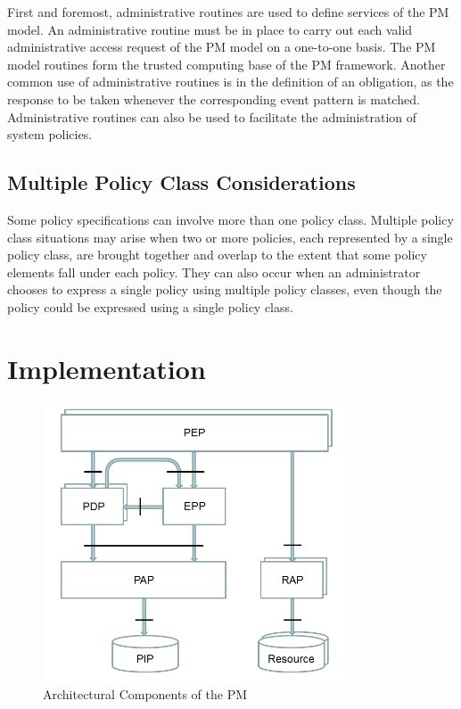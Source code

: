 \documentclass[12pt,a4paper,titlepage]{book}
\begin{document}
	First and foremost, administrative routines are used to define services of the PM model. An administrative routine must be in place to carry out each valid administrative access request of the PM model on a one-to-one basis. The PM model routines form the trusted computing base of the PM framework. Another common use of administrative routines is in the definition of an obligation, as the response to be taken whenever the corresponding event pattern is matched. Administrative routines can also be used to facilitate the administration of system policies.
	
	\section{Multiple Policy Class Considerations}
	
	Some policy specifications can involve more than one policy class. Multiple policy class situations may arise when two or more policies, each represented by a single policy class, are brought together and overlap to the extent that some policy elements fall under each policy. They can also occur when an administrator chooses to express a single policy using multiple policy classes, even though the policy could be expressed using a single policy class.
	
	\chapter{Implementation}
	
	\begin{figure}[h]
		\centering
		\includegraphics[width = 0.8\textwidth]{images/ArchitecturalComponentsPM.png}
		\caption{Architectural Components of the PM}
		\label{fig:ArchitecturalComponentsPM}
	\end{figure}
	
\end{document}

